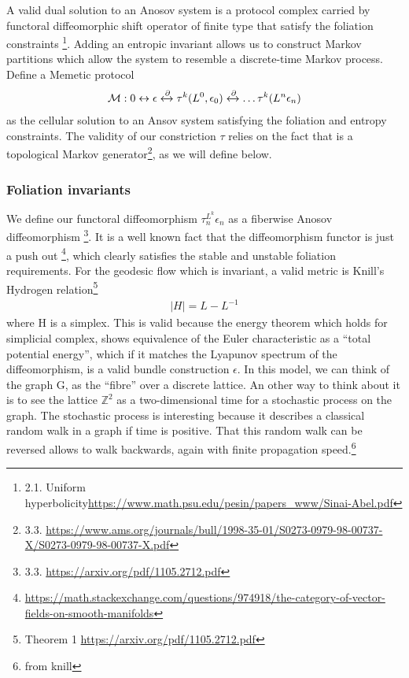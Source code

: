 \documentclass{article}
\begin{document}
A valid dual solution to an Anosov system is a protocol complex carried by functoral diffeomorphic shift operator of finite type that satisfy the foliation constraints \footnote{2.1. Uniform hyperbolicity\url{https://www.math.psu.edu/pesin/papers_www/Sinai-Abel.pdf}}. Adding an entropic invariant allows us to construct Markov partitions which allow the system to resemble a discrete-time Markov process. Define a Memetic protocol
\begin{equation} \label{eq1}
\begin{split}
\mathcal{M}: 0 \leftrightarrow \epsilon \xleftrightarrow{\partial} \tau^{k}(L^0, \epsilon_0) \xleftrightarrow{\partial} \dots \tau^{k}(L^n \epsilon_n)
\end{split}
\end{equation}
as the cellular solution to an Ansov system satisfying the foliation and entropy constraints. The validity of our constriction $\tau$ relies on the fact that is a topological Markov generator\footnote{3.3. \url{https://www.ams.org/journals/bull/1998-35-01/S0273-0979-98-00737-X/S0273-0979-98-00737-X.pdf}}, as we will define below.

\subsubsection{Foliation invariants} 
We define our functoral diffeomorphism $\tau^{L^k}_n \epsilon_n$ as a fiberwise Anosov diffeomorphism \footnote{3.3. \url{https://arxiv.org/pdf/1105.2712.pdf}}. It is a well known fact that the diffeomorphism functor is just a push out \footnote{\url{https://math.stackexchange.com/questions/974918/the-category-of-vector-fields-on-smooth-manifolds}}, which clearly satisfies the stable and unstable foliation requirements. For the geodesic flow which is invariant, a valid metric is Knill's Hydrogen relation\footnote{Theorem 1 \url{https://arxiv.org/pdf/1105.2712.pdf}}
\begin{equation} \label{eq1}
\begin{split}
|{}H|{} = L - L^{-1}
\end{split}
\end{equation}
where H is a simplex. This is valid because the energy theorem which holds for simplicial complex, shows equivalence of the Euler characteristic as a “total potential energy”, which if it matches the Lyapunov spectrum of the diffeomorphism, is a valid bundle construction $\epsilon$. In this model, we can think of the graph G, as the “fibre” over a discrete lattice. 
An other way to think about it is to see the lattice $\mathbb{Z}^2$ as a two-dimensional time for a stochastic process on the graph. The stochastic process is interesting because it describes a classical random walk in a graph if time is positive. That this random walk can be reversed allows to walk backwards, again with finite propagation speed.\footnote{from knill}
\end{document}
